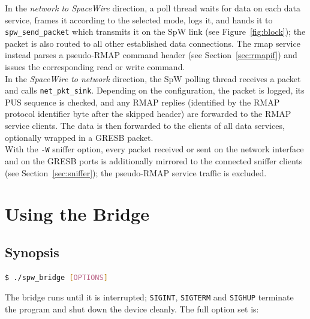 In the \emph{network to SpaceWire} direction, a poll thread waits for data on
each data service, frames it according to the selected mode, logs it, and hands
it to \texttt{spw\_send\_packet} which transmits it on the \gls{SpW} link (see
Figure~\ref{fig:block}); the packet is also routed to all other established
data connections. The
rmap service instead parses a pseudo-\gls{RMAP} command header (see
Section~\ref{sec:rmapif}) and issues the corresponding read or write command.
\\

In the \emph{SpaceWire to network} direction, the \gls{SpW} polling thread
receives a packet and calls \texttt{net\_pkt\_sink}. Depending on the
configuration, the packet is logged, its PUS sequence is checked, and any
RMAP replies (identified by the RMAP protocol identifier byte after the
skipped header) are forwarded to the RMAP service clients. The data is then
forwarded to the clients of all data services, optionally wrapped in a GRESB
packet.
\\
With the \texttt{-W} sniffer option, every packet received or sent on the
network interface and on the GRESB ports is additionally mirrored to the
connected sniffer clients (see Section~\ref{sec:sniffer}); the
pseudo-\gls{RMAP} service traffic is excluded.


\chapter{Using the Bridge}
\label{cha:usage}

\section{Synopsis}

\begin{lstlisting}[language=bash]
  $ ./spw_bridge [OPTIONS]
\end{lstlisting}

\noindent
The bridge runs until it is interrupted; \texttt{SIGINT}, \texttt{SIGTERM}
and \texttt{SIGHUP} terminate the program and shut down the device cleanly.
The full option set is:

